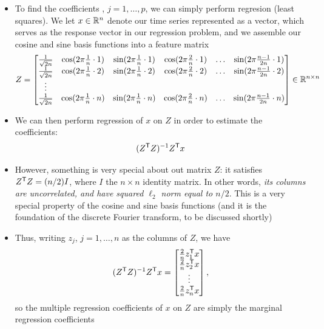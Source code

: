 \documentclass{article}
\begin{document}
\begin{itemize}
\item To find the coefficients , $j = 1,\dots,p$,
  we can simply perform regresion (least squares). We let $x \in \mathbb{R}^n$ denote
  our time series represented as a vector, which serves as the response vector
  in our regression problem, and we assemble our cosine and sine basis functions
  into a feature matrix  
  \[
  Z = \begin{bmatrix}
  \frac{1}{\sqrt{2n}} & \cos(2\pi \frac{1}{n} \cdot 1) & \sin(2\pi \frac{1}{n}
  \cdot 1) & \cos(2\pi \frac{2}{n} \cdot 1) & \dots & \sin(2\pi \frac{n-1}{2n}
  \cdot 1) \\  
  \frac{1}{\sqrt{2n}}  & \cos(2\pi \frac{1}{n} \cdot 2) & \sin(2\pi \frac{1}{n}
  \cdot 2) & \cos(2\pi \frac{2}{n} \cdot 2) & \dots & \sin(2\pi \frac{n-1}{2n}
  \cdot 2) \\  
  \vdots & & & & & \\
  \frac{1}{\sqrt{2n}}  & \cos(2\pi \frac{1}{n} \cdot n) & \sin(2\pi \frac{1}{n}
  \cdot n) & \cos(2\pi \frac{2}{n} \cdot n) & \dots & \sin(2\pi \frac{n-1}{2n}
  \cdot n)  
  \end{bmatrix} \in \mathbb{R}^{n \times n}
  \]

\item We can then perform regression of $x$ on $Z$ in order to estimate the
  coefficients: 
  \[
  (Z^{\mathsf{T}} Z)^{-1} Z^{\mathsf{T}} x
  \]

\item However, something is very special about out matrix $Z$: it satisfies 
  $Z^{\mathsf{T}} Z = (n/2) I$, where $I$ the $n \times n$ identity matrix. In other
  words, \emph{its columns are uncorrelated, and have squared $\ell_2$ norm
    equal to $n/2$}. This is a very special property of the cosine and sine
  basis functions (and it is the foundation of the discrete Fourier transform, 
  to be discussed shortly)
    
\item Thus, writing $z_j$, $j = 1,\dots,n$ as the columns of $Z$, we have
  \renewcommand{\arraystretch}{1.3} 
  \[
  (Z^{\mathsf{T}} Z)^{-1} Z^{\mathsf{T}} x = \begin{bmatrix} \frac{2}{n} z_1^{\mathsf{T}} x \\ \frac{2}{n}
    z_2^{\mathsf{T}} x \\ \vdots \\ \frac{2}{n} z_n^{\mathsf{T}}  x \end{bmatrix},
  \]
 \renewcommand{\arraystretch}{1} 
  so the multiple regression coefficients of $x$ on $Z$ are simply the marginal
  regression coefficients


\end{itemize}
\end{document}
